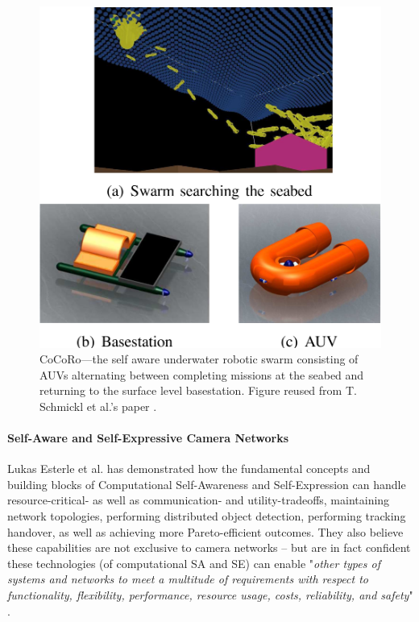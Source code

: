 			\begin{figure}[!ht]
			\centering
			\includegraphics[width=0.8\columnwidth]{Assets/DocSegments/Chapters/Background/Figures/Schema/cocoro.PNG}
			\caption{CoCoRo—the self aware underwater robotic swarm consisting of AUVs alternating between completing missions at the seabed and returning to the surface level basestation. Figure reused from T. Schmickl et al.'s paper \cite{cocoro}.}
			\label{fig:cocoro}
			\end{figure}

			\paragraph{Self-Aware and Self-Expressive Camera Networks}

			Lukas Esterle et al. \cite{esterle_camera} has demonstrated how the fundamental concepts and building blocks of Computational Self-Awareness and Self-Expression can handle resource-critical- as well as communication- and utility-tradeoffs, maintaining network topologies, performing distributed object detection, performing tracking handover, as well as achieving more Pareto-efficient outcomes. They also believe these capabilities are not exclusive to camera networks -- but are in fact confident these technologies (of computational SA and SE) can enable "\textit{other types of systems and networks to meet a multitude of requirements with respect to functionality, flexibility, performance, resource usage, costs, reliability, and safety}" \cite{esterle_camera}.
			
